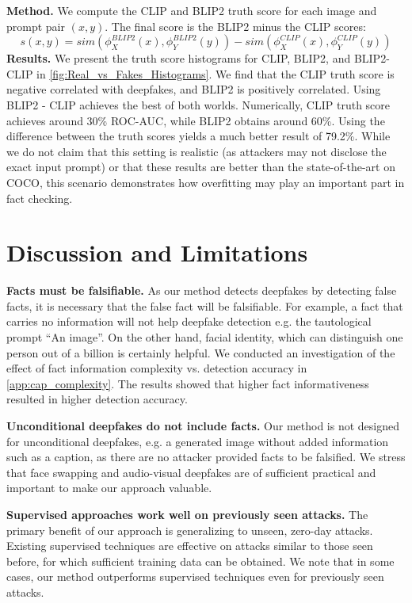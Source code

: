\documentclass{article} \usepackage{iclr2024_conference,times}
\begin{document}
\textbf{Method.} We compute the CLIP and BLIP2 truth score for each image and prompt pair $(x, y)$. The final score is the BLIP2 minus the CLIP scores:
\begin{equation}
s(x, y) = sim(\phi^{BLIP2}_{X}(x), \phi^{BLIP2}_{Y}(y)) - sim(\phi^{CLIP}_{X}(x), \phi^{CLIP}_{Y}(y))
\end{equation}
\textbf{Results.} We present the truth score histograms for CLIP, BLIP2, and BLIP2-CLIP in \cref{fig:Real_vs_Fakes_Histograms}. We find that the CLIP truth score is negative correlated with deepfakes, and BLIP2 is positively correlated. Using BLIP2 - CLIP achieves the best of both worlds. Numerically, CLIP truth score achieves around 30\% ROC-AUC, while BLIP2 obtains around 60\%. Using the difference between the truth scores yields a much better result of 79.2\%. While we do not claim that this setting is realistic (as attackers may not disclose the exact input prompt) or that these results are better than the state-of-the-art on COCO, this scenario demonstrates how overfitting may play an important part in fact checking.

\section{Discussion and Limitations}

\textbf{Facts must be falsifiable.} As our method detects deepfakes by detecting false facts, it is necessary that the false fact will be falsifiable. For example, a fact that carries no information will not help deepfake detection e.g. the tautological prompt “An image”. On the other hand, facial identity, which can distinguish one person out of a billion is certainly helpful. We conducted an investigation of the effect of fact information complexity vs. detection accuracy in \cref{app:cap_complexity}. The results showed that higher fact informativeness resulted in higher detection accuracy.  

\textbf{Unconditional deepfakes do not include facts.} Our method is not designed for unconditional deepfakes, e.g. a generated image without added information such as a caption, as there are no attacker provided facts to be falsified. We stress that face swapping and audio-visual deepfakes are of sufficient practical and important to make our approach valuable. 

\textbf{Supervised approaches work well on previously seen attacks.} The primary benefit of our approach is generalizing to unseen, zero-day attacks. Existing supervised techniques are effective on attacks similar to those seen before, for which sufficient training data can be obtained. We note that in some cases, our method outperforms supervised techniques even for previously seen attacks.
\end{document}
